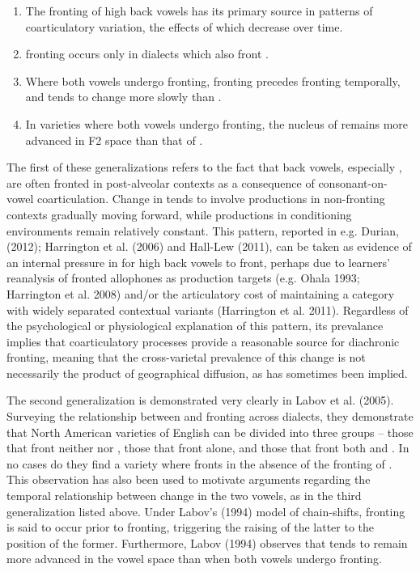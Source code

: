 \documentclass[12pt]{article}
\begin{document}
\begin{enumerate}
\item{The fronting of high back vowels has its primary source in patterns of coarticulatory variation, the effects of which decrease over time.}
\item{ fronting occurs only in dialects which also front .}
\item{Where both vowels undergo fronting,  fronting precedes  fronting temporally, and  tends to change more slowly than .}
\item{In varieties where both vowels undergo fronting, the nucleus of  remains more advanced in F2 space than that of .}
\end{enumerate}

The first of these generalizations refers to the fact that back vowels, especially , are often fronted in post-alveolar contexts as a consequence of consonant-on-vowel coarticulation. Change in  tends to involve productions in non-fronting contexts gradually moving forward, while productions in conditioning environments remain relatively constant. This pattern, reported in e.g. Durian, (2012); Harrington et al. (2006) and Hall-Lew (2011), can be taken as evidence of an internal pressure in for high back vowels to front, perhaps due to learners' reanalysis of fronted allophones as production targets (e.g. Ohala 1993; Harrington et al. 2008) and/or the articulatory cost of maintaining a category with widely separated contextual variants (Harrington et al. 2011). Regardless of the psychological or physiological explanation of this pattern, its prevalance implies that coarticulatory processes provide a reasonable source for diachronic fronting, meaning that the cross-varietal prevalence of this change is not necessarily the product of geographical diffusion, as has sometimes been implied.

The second generalization is demonstrated very clearly in Labov et al. (2005).   Surveying the relationship between  and  fronting across dialects, they demonstrate that North American varieties of English can be divided into three groups -- those that front neither  nor , those that front  alone, and those that front both  and . In no cases do they find a variety where  fronts in the absence of the fronting of . This observation has also been used to motivate arguments regarding the temporal relationship between change in the two vowels, as in the third generalization listed above. Under Labov's (1994) model of chain-shifts,  fronting is said to occur prior to  fronting, triggering the raising of the latter to the position of the former. Furthermore, Labov (1994) observes that  tends to remain more advanced in the vowel space than  when both vowels undergo fronting. 
\end{document}
